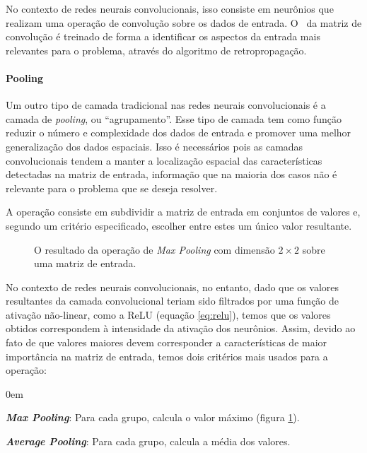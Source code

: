 No contexto de redes neurais convolucionais, isso consiste em neurônios que realizam uma operação de convolução sobre os dados de entrada.
O \ da matriz de convolução é treinado de forma a identificar os aspectos da entrada mais relevantes para o problema, através do algoritmo de retropropagação.

\paragraph{Pooling}
\label{sec:pooling}

Um outro tipo de camada tradicional nas redes neurais convolucionais é a camada de \textit{pooling}, ou ``agrupamento''.
Esse tipo de camada tem como função reduzir o número e complexidade dos dados de entrada e promover uma melhor generalização dos dados espaciais.
Isso é necessários pois as camadas convolucionais tendem a manter a localização espacial das características detectadas na matriz de entrada, informação que na maioria dos casos não é relevante para o problema que se deseja resolver.

A operação consiste em subdividir a matriz de entrada em conjuntos de valores e, segundo um critério especificado, escolher entre estes um único valor resultante.

\begin{figure}[ht]
    \centering
    
    \caption{O resultado da operação de \textit{Max Pooling} com dimensão $2\times2$ sobre uma matriz de entrada.}
    \label{fig:maxpool}
\end{figure}

No contexto de redes neurais convolucionais, no entanto, dado que os valores resultantes da camada convolucional teriam sido filtrados por uma função de ativação não-linear, como a ReLU (equação \ref{eq:relu}), temos que os valores obtidos correspondem à intensidade da ativação dos neurônios.
Assim, devido ao fato de que valores maiores devem corresponder a características de maior importância na matriz de entrada, temos dois critérios mais usados para a operação:

\begin{description}
    \itemsep0em 
    \item \textit{\textbf{Max Pooling}}: Para cada grupo, calcula o valor máximo (figura \ref{fig:maxpool}).
    \item \textit{\textbf{Average Pooling}}: Para cada grupo, calcula a média dos valores.
\end{description}

